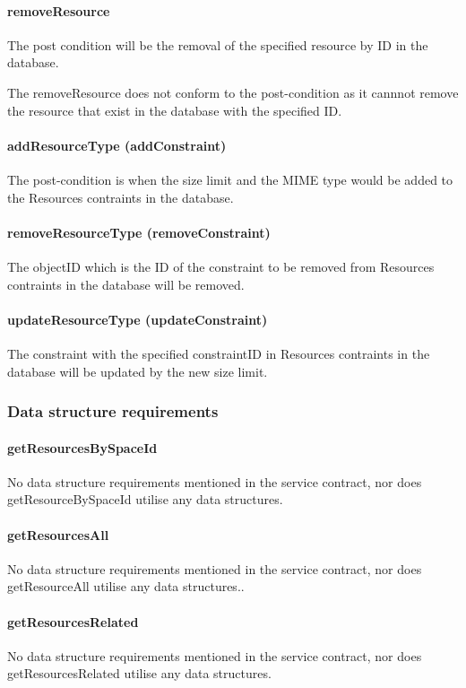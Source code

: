 \documentclass[a4paper]{article}
\begin{document}
\paragraph{removeResource}
The post condition will be the removal of the specified resource by ID in the database.

The removeResource does not conform to the post-condition as it cannnot remove the resource that exist in the database with the specified ID.

\paragraph{addResourceType (addConstraint)}
The post-condition is when the size limit and the MIME type would be added to the Resources contraints in the database.

\paragraph{removeResourceType (removeConstraint)}
The objectID which is the ID of the constraint to be removed from Resources contraints in the database will be removed.

\paragraph{updateResourceType (updateConstraint)}
The constraint with the specified constraintID in Resources contraints in the database will be updated by the new size limit.
\subsubsection {Data structure requirements}

\paragraph{getResourcesBySpaceId}
No data structure requirements mentioned in the service contract, nor does getResourceBySpaceId utilise any data structures.

\paragraph{getResourcesAll}
No data structure requirements mentioned in the service contract, nor does getResourceAll utilise any data structures..

\paragraph{getResourcesRelated}
No data structure requirements mentioned in the service contract, nor does getResourcesRelated utilise any data structures.
\end{document}
